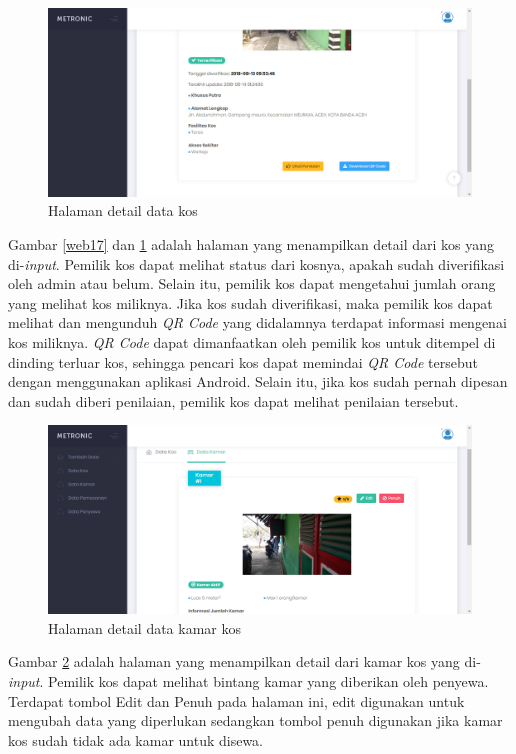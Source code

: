 \begin{enumerate}[a.]
		\begin{figure}[H]
			\centering
			\includegraphics[width=\textwidth]{gambar/web/18}
			\caption{Halaman detail data kos}
			\label{web18}
		\end{figure}
		
		Gambar \ref{web17} dan \ref{web18} adalah halaman yang menampilkan detail dari kos yang di-\textit{input}. Pemilik kos dapat melihat status dari kosnya, apakah sudah diverifikasi oleh admin atau belum. Selain itu, pemilik kos dapat mengetahui jumlah orang yang melihat kos miliknya. Jika kos sudah diverifikasi, maka pemilik kos dapat melihat dan mengunduh \textit{QR Code} yang didalamnya terdapat informasi mengenai kos miliknya. \textit{QR Code} dapat dimanfaatkan oleh pemilik kos untuk ditempel di dinding terluar kos, sehingga pencari kos dapat memindai \textit{QR Code} tersebut dengan menggunakan aplikasi Android. Selain itu, jika kos sudah pernah dipesan dan sudah diberi penilaian, pemilik kos dapat melihat penilaian tersebut.
		
		\begin{figure}[H]
			\centering
			\includegraphics[width=\textwidth]{gambar/web/19}
			\caption{Halaman detail data kamar kos}
			\label{web19}
		\end{figure}
	
		Gambar \ref{web19} adalah halaman yang menampilkan detail dari kamar kos yang di-\textit{input}. Pemilik kos dapat melihat bintang kamar yang diberikan oleh penyewa. Terdapat tombol Edit dan Penuh pada halaman ini, edit digunakan untuk mengubah data yang diperlukan sedangkan tombol penuh digunakan jika kamar kos sudah tidak ada kamar untuk disewa.
		

\end{enumerate}
